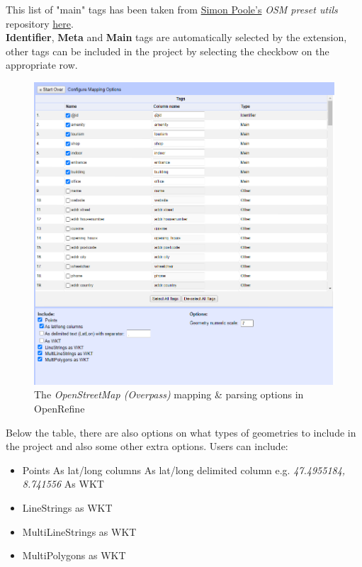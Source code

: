 \newline
This list of "main" tags has been taken from \href{https://github.com/simonpoole}{Simon Poole's} \textit{OSM preset utils}
repository \href{https://github.com/simonpoole/preset-utils/blob/master/src/main/java/ch/poole/osm/presetutils/Tags.java}{here}.\\
\newline
\textbf{Identifier}, \textbf{Meta} and \textbf{Main} tags are automatically selected by the extension, other tags can 
be included in the project by selecting the checkbow on the appropriate row.
\begin{figure}[H]
    \includegraphics[width=\linewidth]{./Figures/OSM_Extractor/osm_extractor_parsing_table.png}
    \caption{The \textit{OpenStreetMap (Overpass)} mapping \& parsing options in OpenRefine}
\end{figure}
Below the table, there are also options on what types of geometries to include in the project and also some other extra options.
Users can include:
\begin{itemize}
    \item Points
        \subitem As lat/long columns
        \subitem As lat/long delimited column e.g. \textit{47.4955184, 8.741556}
        \subitem As WKT
    \item LineStrings as WKT
    \item MultiLineStrings as WKT
    \item MultiPolygons as WKT
\end{itemize}
